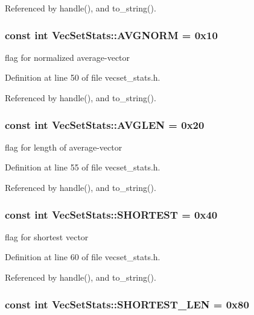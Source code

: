 Referenced by handle(), and to\_\-string().\hypertarget{class_vec_set_stats_0972452644e7552d3de11d9763f04d13}{
\subsubsection[AVGNORM]{\setlength{\rightskip}{0pt plus 5cm}const int {\bf VecSetStats::AVGNORM} = 0x10}}
\label{class_vec_set_stats_0972452644e7552d3de11d9763f04d13}


flag for normalized average-vector 

Definition at line 50 of file vecset\_\-stats.h.

Referenced by handle(), and to\_\-string().\hypertarget{class_vec_set_stats_6d85082797085df8918a799163244e20}{
\subsubsection[AVGLEN]{\setlength{\rightskip}{0pt plus 5cm}const int {\bf VecSetStats::AVGLEN} = 0x20}}
\label{class_vec_set_stats_6d85082797085df8918a799163244e20}


flag for length of average-vector 

Definition at line 55 of file vecset\_\-stats.h.

Referenced by handle(), and to\_\-string().\hypertarget{class_vec_set_stats_5ec901fadff91737ffd16ca3d89e08f2}{
\subsubsection[SHORTEST]{\setlength{\rightskip}{0pt plus 5cm}const int {\bf VecSetStats::SHORTEST} = 0x40}}
\label{class_vec_set_stats_5ec901fadff91737ffd16ca3d89e08f2}


flag for shortest vector 

Definition at line 60 of file vecset\_\-stats.h.

Referenced by handle(), and to\_\-string().\hypertarget{class_vec_set_stats_3023bfabad5006b6dce50482725a2319}{
\subsubsection[SHORTEST\_\-LEN]{\setlength{\rightskip}{0pt plus 5cm}const int {\bf VecSetStats::SHORTEST\_\-LEN} = 0x80}}
\label{class_vec_set_stats_3023bfabad5006b6dce50482725a2319}


